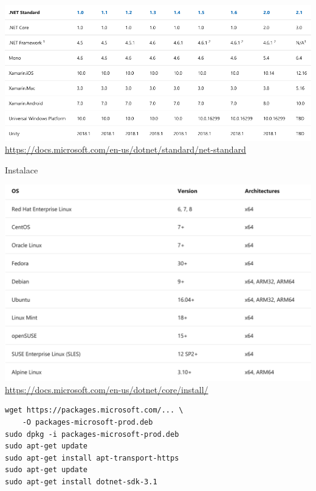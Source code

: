 \documentclass[utf8x]{beamer}
\begin{document}

\begin{frame}[plain]
    \centering
    \includegraphics[width=\textwidth]{netstandard.png}
    \tiny\url{https://docs.microsoft.com/en-us/dotnet/standard/net-standard}
\end{frame}

\begin{frame}
    \begin{center}
        \color{vulkan}
        \Huge \textrm{Instalace}
    \end{center}
\end{frame}

\begin{frame}
    \centering
    \includegraphics[width=\textwidth]{support.png}
    \tiny\url{https://docs.microsoft.com/en-us/dotnet/core/install/}
\end{frame}

\begin{frame}[fragile]
\begin{center}
\begin{verbatim}
wget https://packages.microsoft.com/... \
    -O packages-microsoft-prod.deb
sudo dpkg -i packages-microsoft-prod.deb
sudo apt-get update
sudo apt-get install apt-transport-https
sudo apt-get update
sudo apt-get install dotnet-sdk-3.1
\end{verbatim}
\end{center}
\end{frame}
\end{document}
